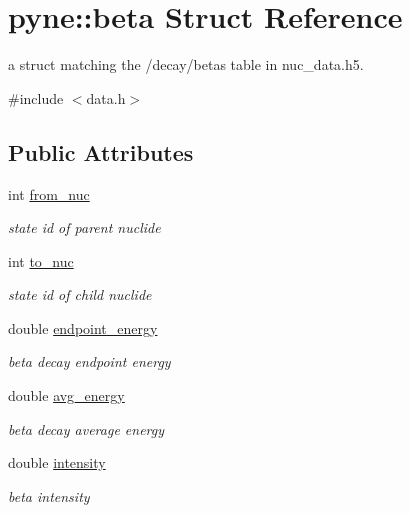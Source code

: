 \hypertarget{structpyne_1_1beta}{}\section{pyne\+:\+:beta Struct Reference}
\label{structpyne_1_1beta}


a struct matching the \textquotesingle{}/decay/betas\textquotesingle{} table in nuc\+\_\+data.\+h5.  




{\ttfamily \#include $<$data.\+h$>$}

\subsection*{Public Attributes}
\begin{DoxyCompactItemize}
\item 
\mbox{\label{structpyne_1_1beta_ad312f7cc9b8f0096aa1b797f28e10390}} 
int \hyperlink{structpyne_1_1beta_ad312f7cc9b8f0096aa1b797f28e10390}{from\+\_\+nuc}
\begin{DoxyCompactList}\small\item\em state id of parent nuclide \end{DoxyCompactList}\item 
\mbox{\label{structpyne_1_1beta_a359665983e92b3d729c6996faae54a18}} 
int \hyperlink{structpyne_1_1beta_a359665983e92b3d729c6996faae54a18}{to\+\_\+nuc}
\begin{DoxyCompactList}\small\item\em state id of child nuclide \end{DoxyCompactList}\item 
\mbox{\label{structpyne_1_1beta_a1d23daf403d723e17a21070ebba1aa4f}} 
double \hyperlink{structpyne_1_1beta_a1d23daf403d723e17a21070ebba1aa4f}{endpoint\+\_\+energy}
\begin{DoxyCompactList}\small\item\em beta decay endpoint energy \end{DoxyCompactList}\item 
\mbox{\label{structpyne_1_1beta_aef1da93efa75bfbb8c77604b8c24ba04}} 
double \hyperlink{structpyne_1_1beta_aef1da93efa75bfbb8c77604b8c24ba04}{avg\+\_\+energy}
\begin{DoxyCompactList}\small\item\em beta decay average energy \end{DoxyCompactList}\item 
\mbox{\label{structpyne_1_1beta_a9c2cd5b0d491324940bdd68bde23113a}} 
double \hyperlink{structpyne_1_1beta_a9c2cd5b0d491324940bdd68bde23113a}{intensity}
\begin{DoxyCompactList}\small\item\em beta intensity \end{DoxyCompactList}\end{DoxyCompactItemize}


